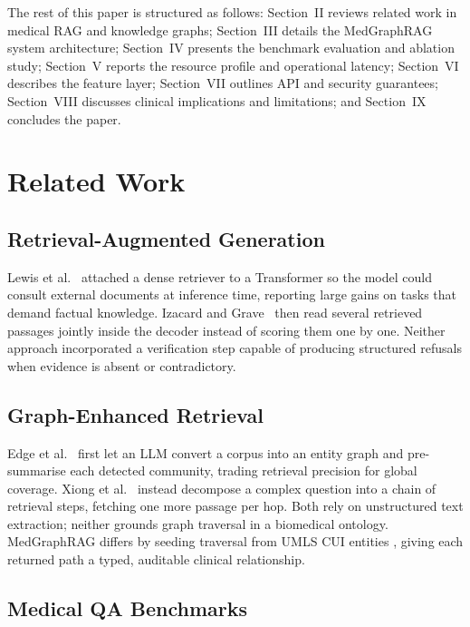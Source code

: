 \documentclass[conference]{IEEEtran}
\begin{document}
The rest of this paper is structured as follows: Section~II reviews related
work in medical RAG and knowledge graphs; Section~III details the MedGraphRAG
system architecture; Section~IV presents the benchmark evaluation and ablation
study; Section~V reports the resource profile and operational latency;
Section~VI describes the feature layer; Section~VII outlines API and security
guarantees; Section~VIII discusses clinical implications and limitations; and
Section~IX concludes the paper.

\section{Related Work}

\subsection{Retrieval-Augmented Generation}

Lewis et al.~\cite{lewis2020retrieval} attached a dense retriever to a
Transformer so the model could consult external documents at inference
time, reporting large gains on tasks that demand factual knowledge. Izacard
and Grave~\cite{izacard2021leveraging} then read several retrieved passages
jointly inside the decoder instead of scoring them one by one. Neither
approach incorporated a verification step capable of producing structured
refusals when evidence is absent or contradictory.

\subsection{Graph-Enhanced Retrieval}

Edge et al.~\cite{edge2024local} first let an LLM convert a corpus into an
entity graph and pre-summarise each detected community, trading retrieval
precision for global coverage. Xiong et al.~\cite{xiong2021answering}
instead decompose a complex question into a chain of retrieval steps,
fetching one more passage per hop. Both rely on unstructured text extraction; neither grounds
graph traversal in a biomedical ontology. MedGraphRAG differs by seeding
traversal from UMLS CUI entities \cite{umls2004}, giving each returned path a
typed, auditable clinical relationship.

\subsection{Medical QA Benchmarks}
\end{document}

